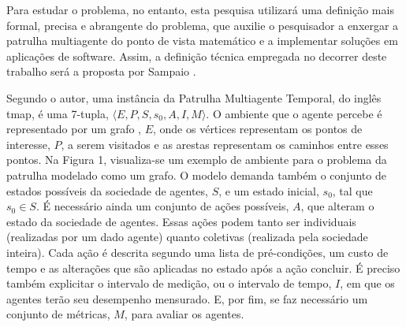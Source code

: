 Para estudar o problema, no entanto, esta pesquisa utilizará uma definição mais 
formal, precisa e abrangente do problema, que auxilie o pesquisador a enxergar 
a patrulha multiagente do ponto de vista matemático e a implementar soluções em 
aplicações de software. Assim, a definição técnica empregada no decorrer deste 
trabalho será a proposta por Sampaio \citep{sampaiophd}.

Segundo o autor, uma instância da Patrulha Multiagente Temporal, do inglês 
\ac{tmap}, é uma 7-tupla, $ \langle E, P, S, s_{0}, A, I, M \rangle $. O 
ambiente que o agente percebe é representado por um grafo 
\citep{Rosen:2002:DMA:579402}, $E$, onde os vértices representam os pontos de 
interesse, $P$, a serem visitados e as arestas representam os caminhos entre 
esses pontos. Na Figura 1, visualiza-se um exemplo de ambiente para o problema 
da patrulha modelado como um grafo. O modelo demanda também o conjunto de 
estados possíveis da sociedade de agentes, $S$, e um estado inicial, $ s_{0} $, 
tal que $ s_{0} \in S $. É necessário ainda um conjunto de ações possíveis, $A$, 
que alteram o estado da sociedade de agentes. Essas ações podem tanto ser 
individuais (realizadas por um dado agente) quanto coletivas (realizada pela 
sociedade inteira). Cada ação é descrita segundo uma lista de pré-condições, um 
custo de tempo e as alterações que são aplicadas no estado após a ação concluir. 
É preciso também explicitar o intervalo de medição, ou o intervalo de tempo, 
$I$, em que os agentes terão seu desempenho mensurado. E, por fim, se faz 
necessário um conjunto de métricas, $M$, para avaliar os agentes.